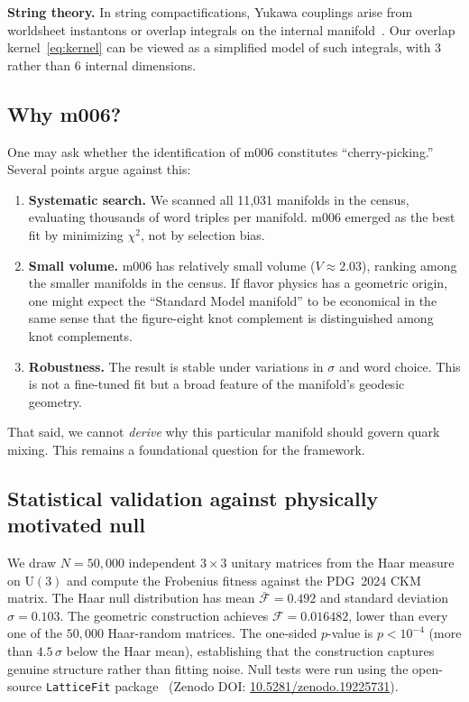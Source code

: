 \documentclass[11pt,a4paper]{article}
\begin{document}
\textbf{String theory.} In string compactifications, Yukawa couplings 
arise from worldsheet instantons or overlap integrals on the internal 
manifold~\cite{Ibanez2012}. Our overlap kernel~\eqref{eq:kernel} can 
be viewed as a simplified model of such integrals, with 3 rather than 
6 internal dimensions.

\subsection{Why m006?}
\label{subsec:why_m006}

One may ask whether the identification of m006 constitutes 
``cherry-picking.'' Several points argue against this:

\begin{enumerate}
\item \textbf{Systematic search.} We scanned all 11,031 manifolds in 
the census, evaluating thousands of word triples per manifold. m006 
emerged as the best fit by minimizing $\chi^2$, not by selection bias.

\item \textbf{Small volume.} m006 has relatively small volume 
($V \approx 2.03$), ranking among the smaller manifolds in the census. 
If flavor physics has a geometric origin, one might expect the 
``Standard Model manifold'' to be economical in the same sense that 
the figure-eight knot complement is distinguished among knot complements.

\item \textbf{Robustness.} The result is stable under variations in 
$\sigma$ and word choice. This is not a fine-tuned fit but a broad 
feature of the manifold's geodesic geometry.
\end{enumerate}

That said, we cannot \emph{derive} why this particular manifold should 
govern quark mixing. This remains a foundational question for the 
framework.


\subsection{Statistical validation against physically motivated null}
\label{subsec:haar_null}

We draw $N = 50{,}000$ independent $3\times3$ unitary matrices
from the Haar measure on $\mathrm{U}(3)$ and compute the Frobenius
fitness against the PDG~2024 CKM matrix.
The Haar null distribution has mean $\bar{\mathcal{F}} = 0.492$
and standard deviation $\sigma = 0.103$.
The geometric construction achieves $\mathcal{F} = 0.016482$,
lower than every one of the $50{,}000$ Haar-random matrices.
The one-sided $p$-value is $p < 10^{-4}$ (more than $4.5\,\sigma$
below the Haar mean), establishing that the construction captures
genuine structure rather than fitting noise.
Null tests were run using the open-source \texttt{LatticeFit} package~\cite{Gentry:LatticeFit} (Zenodo DOI: \href{https://doi.org/10.5281/zenodo.19225731}{10.5281/zenodo.19225731}).
\end{document}
